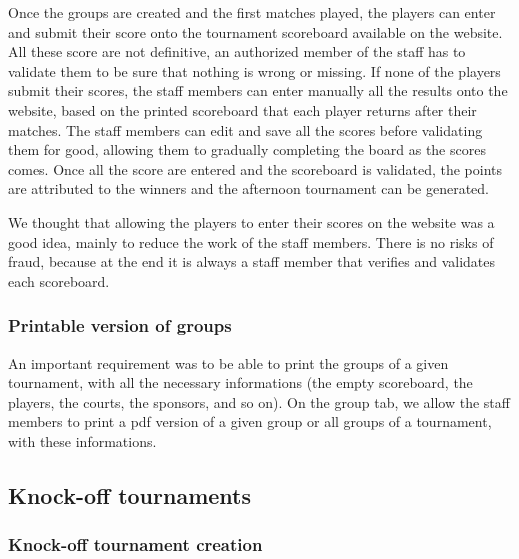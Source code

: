 Once the groups are created and the first matches played, the players can enter and submit their score onto the tournament scoreboard available on the website. All these score are not definitive, an authorized member of the staff has to validate them to be sure that nothing is  wrong or missing. If none of the players submit their scores, the staff members can enter manually all the results onto the website, based on the printed scoreboard that each player returns after their matches. The staff members can edit and save all the scores before validating them for good, allowing them to gradually completing the board as the scores comes. Once all the score are entered and the scoreboard is validated, the points are attributed to the winners and the afternoon tournament can be generated. \newline

We thought that allowing the players to enter their scores on the website was a good idea, mainly to reduce the work of the staff members. There is no risks of fraud, because at the end it is always a staff member that verifies and validates each scoreboard.

\subsubsection{Printable version of groups}
\label{subs:Printable version of groups}


An important requirement was to be able to print the groups of a given tournament, with all the necessary informations (the empty scoreboard, the players, the courts, the sponsors, and so on). On the group tab, we allow the staff members to print a pdf version of a given group or all groups of a tournament, with these informations. 

\subsection{Knock-off tournaments}
\label{sub:Knock-off tournaments}

\subsubsection{Knock-off tournament creation}
\label{subs:Knock-off tournament creation}


